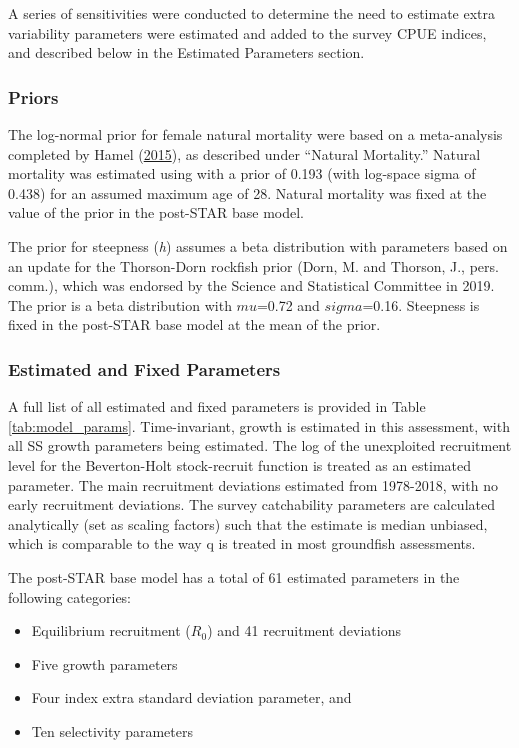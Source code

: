 \documentclass[12pt,]{article}
\begin{document}
A series of sensitivities were conducted to determine the need to
estimate extra variability parameters were estimated and added to the
survey CPUE indices, and described below in the Estimated Parameters
section.

\subsubsection{Priors}\label{priors}

The log-normal prior for female natural mortality were based on a
meta-analysis completed by Hamel
(\protect\hyperlink{ref-Hamel2015}{2015}), as described under ``Natural
Mortality.'' Natural mortality was estimated using with a prior of 0.193
(with log-space sigma of 0.438) for an assumed maximum age of 28.
Natural mortality was fixed at the value of the prior in the post-STAR
base model.

The prior for steepness (\emph{h}) assumes a beta distribution with
parameters based on an update for the Thorson-Dorn rockfish prior (Dorn,
M. and Thorson, J., pers. comm.), which was endorsed by the Science and
Statistical Committee in 2019. The prior is a beta distribution with
\(mu\)=0.72 and \(sigma\)=0.16. Steepness is fixed in the post-STAR base
model at the mean of the prior.

\subsubsection{Estimated and Fixed
Parameters}\label{estimated-and-fixed-parameters}

A full list of all estimated and fixed parameters is provided in Table
\ref{tab:model_params}. Time-invariant, growth is estimated in this
assessment, with all SS growth parameters being estimated. The log of
the unexploited recruitment level for the Beverton-Holt stock-recruit
function is treated as an estimated parameter. The main recruitment
deviations estimated from 1978-2018, with no early recruitment
deviations. The survey catchability parameters are calculated
analytically (set as scaling factors) such that the estimate is median
unbiased, which is comparable to the way q is treated in most groundfish
assessments.

The post-STAR base model has a total of 61 estimated parameters in the
following categories:

\begin{itemize}
  \item Equilibrium recruitment ($R_0$) and 41 recruitment deviations
  \item Five growth parameters
  \item Four index extra standard deviation parameter, and
  \item Ten selectivity parameters
\end{itemize}
\end{document}
